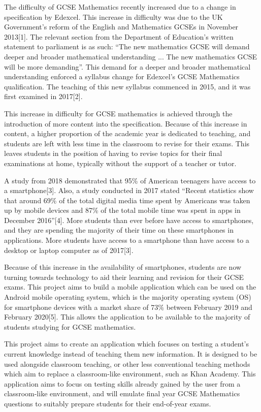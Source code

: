 \documentclass{article}
\begin{document}
The difficulty of GCSE Mathematics recently increased due to a change in specification by Edexcel. This increase in difficulty was due to the UK Government's reform of the English and Mathematics GCSEs in November 2013[1]. The relevant section from the Department of Education's written statement to parliament is as such: ``The new mathematics GCSE will demand deeper and broader mathematical understanding ...  The new mathematics GCSE will be more demanding''. This demand for a deeper and broader mathematical understanding enforced a syllabus change for Edexcel's GCSE Mathematics qualification. The teaching of this new syllabus commenced in 2015, and it was first examined in 2017[2]. \par

This increase in difficulty for GCSE mathematics is achieved through the introduction of more content into the specification. Because of this increase in content, a higher proportion of the academic year is dedicated to teaching, and students are left with less time in the classroom to revise for their exams. This leaves students in the position of having to revise topics for their final examinations at home, typically without the support of a teacher or tutor. \par

A study from 2018 demonstrated that 95\% of American teenagers have access to a smartphone[3]. Also, a study conducted in 2017 stated ``Recent statistics show that around 69\% of the total digital media time spent by Americans was taken up by mobile devices and 87\% of the total mobile time was spent in apps in December 2016''[4]. More students than ever before have access to smartphones, and they are spending the majority of their time on these smartphones in applications. More students have access to a smartphone than have access to a desktop or laptop computer as of 2017[3]. \par

Because of this increase in the availability of smartphones, students are now turning towards technology to aid their learning and revision for their GCSE exams. This project aims to build a mobile application which can be used on the Android mobile operating system, which is the majority operating system (OS) for smartphone devices with a market share of 73\% between February 2019 and February 2020[5]. This allows the application to be available to the majority of students studying for GCSE mathematics. \par

This project aims to create an application which focuses on testing a student's current knowledge instead of teaching them new information. It is designed to be used alongside classroom teaching, or other less conventional teaching methods which aim to replace a classroom-like environment, such as Khan Academy. This application aims to focus on testing skills already gained by the user from a classroom-like environment, and will emulate final year GCSE Mathematics questions to suitably prepare students for their end-of-year exams. \par
\end{document}
